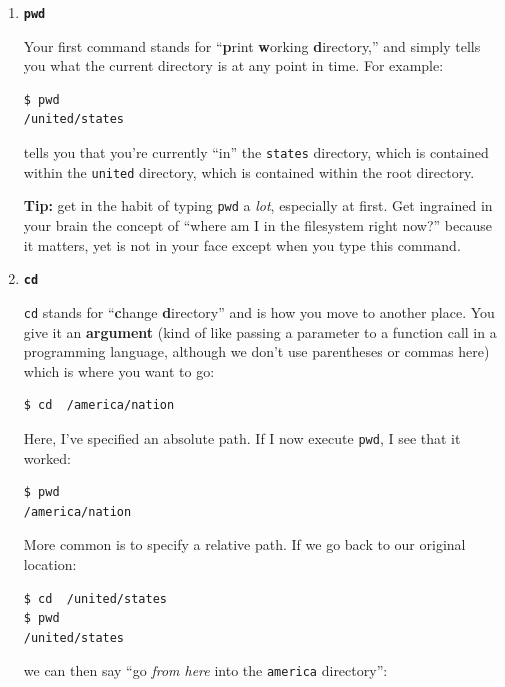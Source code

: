 \begin{enumerate}
\itemsep.1em
\item \textbf{\texttt{pwd}}

Your first command stands for ``\textbf{p}rint \textbf{w}orking
\textbf{d}irectory,'' and simply tells you what the current directory is at any
point in time. For example:

\begin{Verbatim}[fontsize=\small]
$ pwd
/united/states
\end{Verbatim}

tells you that you're currently ``in'' the \texttt{states} directory, which is
contained within the \texttt{united} directory, which is contained within the
root directory.

\textbf{Tip:} get in the habit of typing \texttt{pwd} a \textit{lot},
especially at first. Get ingrained in your brain the concept of ``where am I
in the filesystem right now?'' because it matters, yet is not in your face
except when you type this command.

\bigline
\item \textbf{\texttt{cd}}

\texttt{cd} stands for ``\textbf{c}hange \textbf{d}irectory'' and is how you
move to another place. You give it an \textbf{argument} (kind of like passing
a parameter to a function call in a programming language, although we don't
use parentheses or commas here) which is where you want to go:

\begin{Verbatim}[fontsize=\small]
$ cd  /america/nation
\end{Verbatim}

Here, I've specified an absolute path. If I now execute \texttt{pwd}, I see
that it worked:
\begin{Verbatim}[fontsize=\small]
$ pwd
/america/nation
\end{Verbatim}

More common is to specify a relative path. If we go back to our original
location:

\begin{Verbatim}[fontsize=\small]
$ cd  /united/states
$ pwd
/united/states
\end{Verbatim}

we can then say ``go \textit{from here} into the \texttt{america} directory'':


\end{enumerate}
